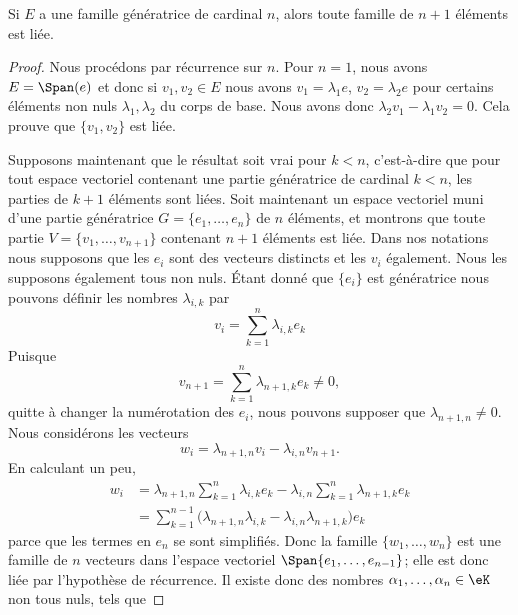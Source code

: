 \begin{lemma}       \label{LemytHnlD}
	Si \( E\) a une famille génératrice de cardinal \( n\), alors toute famille de \( n+1\) éléments est liée.
\end{lemma}

\begin{proof}
	Nous procédons par récurrence sur \( n\). Pour \( n=1\), nous avons \( E=\Span(e)\) et donc si \( v_1,v_2\in E\) nous avons \( v_1=\lambda_1 e\), \( v_2=\lambda_2e\) pour certains éléments non nuls \( \lambda_1,\lambda_2\) du corps de base. Nous avons donc \( \lambda_2v_1-\lambda_1v_2=0\). Cela prouve que \( \{ v_1,v_2 \}\) est liée.

	Supposons maintenant que le résultat soit vrai pour \( k<n\), c'est-à-dire que pour tout espace vectoriel contenant une partie génératrice de cardinal \( k<n\), les parties de \( k+1\) éléments sont liées. Soit maintenant un espace vectoriel muni d'une partie génératrice \( G=\{ e_1,\ldots, e_n \}\) de \( n\) éléments, et montrons que toute partie \( V=\{ v_1,\ldots, v_{n+1} \}\) contenant \( n+1\) éléments est liée. Dans nos notations nous supposons que les \( e_i\) sont des vecteurs distincts et les \( v_i\) également. Nous les supposons également tous non nuls. Étant donné que \( \{ e_i \}\) est génératrice nous pouvons définir les nombres \( \lambda_{i,k}\) par
	\begin{equation}
		v_i=\sum_{k=1}^n\lambda_{i,k}e_k
	\end{equation}
	Puisque
	\begin{equation}
		v_{n+1}=\sum_{k=1}^n\lambda_{n+1,k}e_k\neq 0,
	\end{equation}
	quitte à changer la numérotation des \( e_i\), nous pouvons supposer que \( \lambda_{n+1,n}\neq 0\). Nous considérons les vecteurs
	\begin{equation}
		w_i=\lambda_{n+1,n}v_i-\lambda_{i,n}v_{n+1}.
	\end{equation}
	En calculant un peu,
	\begin{subequations}
		\begin{align}
			w_i & =\lambda_{n+1,n}\sum_{k=1}^n\lambda_{i,k}e_k-\lambda_{i,n}\sum_{k=1}^n\lambda_{n+1,k}e_k  \\
			    & =\sum_{k=1}^{n-1}\big( \lambda_{n+1,n}\lambda_{i,k}-\lambda_{i,n}\lambda_{n+1,k} \big)e_k
		\end{align}
	\end{subequations}
	parce que les termes en \( e_n\) se sont simplifiés. Donc la famille \( \{ w_1,\ldots, w_n \}\) est une famille de \( n\) vecteurs dans l'espace vectoriel \( \Span\{ e_1,\ldots, e_{n-1} \}\); elle est donc liée par l'hypothèse de récurrence. Il existe donc des nombres \( \alpha_1,\ldots, \alpha_n\in \eK\) non tous nuls, tels que

\end{proof}
